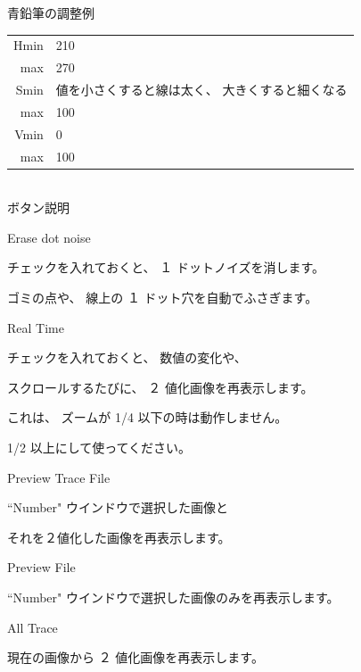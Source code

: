 \documentclass[a4paper,10pt]{article}
\begin{document}
青鉛筆の調整例\\[-1.25em]

\setlength{\tabcolsep}{0em}
\renewcommand{\arraystretch}{1.0}
\hspace{4.0em}\begin{tabular}{rl}
Hmin \hspace{1.0em} & 210\\
max \hspace{1.0em} & 270\\
Smin \hspace{1.0em} & 値を小さくすると線は太く、 大きくすると細くなる\\
max \hspace{1.0em} & 100\\
Vmin \hspace{1.0em} & 0\\
max \hspace{1.0em} & 100\\
\end{tabular}\\[-0.5em]

\noindent ボタン説明\par
Erase dot noise\par
\hspace{4.0em} チェックを入れておくと、 １ ドットノイズを消します。\par
\hspace{4.0em} ゴミの点や、 線上の １ ドット穴を自動でふさぎます。\par
Real Time\par
\hspace{4.0em} チェックを入れておくと、 数値の変化や、\par
\hspace{4.0em} スクロールするたびに、 ２ 値化画像を再表示します。\par
\hspace{4.0em} これは、 ズームが 1/4 以下の時は動作しません。\par
\hspace{4.0em} 1/2 以上にして使ってください。\par
Preview Trace File\par
\hspace{4.0em} “Number" ウインドウで選択した画像と\par
\hspace{4.0em} それを２値化した画像を再表示します。\par
Preview File\par
\hspace{4.0em} “Number" ウインドウで選択した画像のみを再表示します。\par
All Trace\par
\hspace{4.0em} 現在の画像から ２ 値化画像を再表示します。\\
\end{document}
